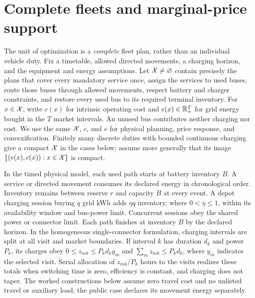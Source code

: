 \section{Complete fleets and marginal-price support}\label{sec:model}

The unit of optimization is a \emph{complete} fleet plan, rather than an
individual vehicle duty.  Fix a timetable, allowed directed movements, a
charging horizon, and the equipment and energy assumptions.  Let
$\mathcal X\ne\varnothing$ contain precisely the plans that cover every mandatory
service once, assign the services to used buses, route those buses through
allowed movements, respect battery and charger constraints, and restore every
used bus to its required terminal inventory.  For $x\in\mathcal X$, write $c(x)$
for intrinsic operating cost and $e(x)\in\mathbb R_+^T$ for grid energy bought in the
$T$ market intervals.  An unused bus contributes neither charging nor cost.
We use the same $\mathcal X$, $c$, and $e$ for physical planning, price response,
and convexification.  Finitely many discrete duties with bounded continuous
charging give a compact $\mathcal X$ in the cases below; assume more generally
that its image $\{(e(x),c(x)):x\in\mathcal X\}$ is compact.

In the timed physical model, each used path starts at battery inventory $B$.
A service or directed movement consumes its declared energy in chronological
order.  Inventory remains between reserve $r$ and capacity $B$ at every
event.  A depot charging session buying $q$ grid kWh adds $\eta q$ inventory,
where $0<\eta\leq1$, within its availability window and bus-power limit.
Concurrent sessions obey the shared power or connector limit.  Each path
finishes at inventory $B$ by the declared horizon.  In the homogeneous
single-connector formulation, charging intervals are split at all visit and
market boundaries.  If interval $k$ has duration $d_k$ and power $P_k$, its
charges obey $0\leq z_{mk}\leq P_kd_k y_m$ and
$\sum_m z_{mk}\leq P_kd_k$, where $y_m$ indicates the selected visit.
Serial allocation of $z_{mk}/P_k$ hours to the visits realizes these totals
when switching time is zero, efficiency is constant, and charging does not
taper.  The worked constructions below assume zero travel cost and no
unlisted travel or auxiliary load; the public case declares its movement
energy separately.

